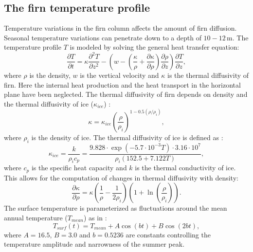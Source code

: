 \documentclass[11pt, draftcls, onecolumn]{IEEEtran} %
\numberwithin{equation}{section}
\numberwithin{table}{section}
\numberwithin{figure}{section}
\begin{document}
\begin{appendices}
\section{The firn temperature profile} \label{sec:firn_temp_profile}
Temperature variations in the firn column affects the amount of firn diffusion.  
Seasonal temperature variations can penetrate down to a depth of $10-12\, \mathrm{m}$. 
The temperature profile $T$ is modeled by solving the general heat transfer equation:
\begin{equation} \label{eq:crank2}
\frac{\partial T}{\partial t} = \kappa\frac{\partial^2 T}{\partial z^2} - \left(w - \left( \frac{\kappa}{\rho}+ \frac{\partial \kappa}{\partial \rho}\right) \frac{\partial \rho}{\partial z}\right) \frac{\partial T}{\partial z},
\end{equation}
where $\rho$ is the density, $w$ is the vertical velocity and $\kappa$ is the thermal diffusivity of firn.
Here the internal heat production and the heat transport in the horizontal plane have been neglected.
The thermal diffusivity of firn depends on density and the thermal diffusivity of ice ($\kappa_{ice}$) \citep{Schwander1997}:
\begin{equation}
\kappa = \kappa_{ice}\left(\frac{\rho}{\rho_i}\right)^{1-0.5(\rho/\rho_i)},
\end{equation}
where $\rho_i$ is the density of ice.
The thermal diffusivity of ice is defined as \citep{Paterson}:
\begin{equation}
\kappa_{ice} = \frac{k}{\rho_i c_p} = \frac{9.828\cdot \exp(-5.7 \cdot 10^{-3}T)\cdot 3.16\cdot 10^7}{\rho_i(152.5 + 7.122T)},
\end{equation}
where $c_p$ is the specific heat capacity and $k$ is the thermal conductivity of ice.
This allows for the computation of changes in thermal diffusivity with density:
\begin{equation}
\frac{\partial \kappa}{\partial \rho}= \kappa \left(\frac{1}{\rho} -\frac{1}{2\rho_i}\right)\left(1 + \ln\left(\frac{\rho}{\rho_i}\right)\right).
\end{equation}
The surface temperature is parameterized as fluctuations around the mean annual temperature ($T_{mean}$) as in \cite{Simonsen2011}:
\begin{equation}
T_{surf}(t) = T_{mean} + A \cos\left(b t\right) + B \cos\left(2 b t\right),
\end{equation}
where $A = 16.5$, $B= 3.0$ and $b = 0.5236$ are constants controlling the temperature amplitude and narrowness of the summer peak.


\end{appendices}
\end{document}
